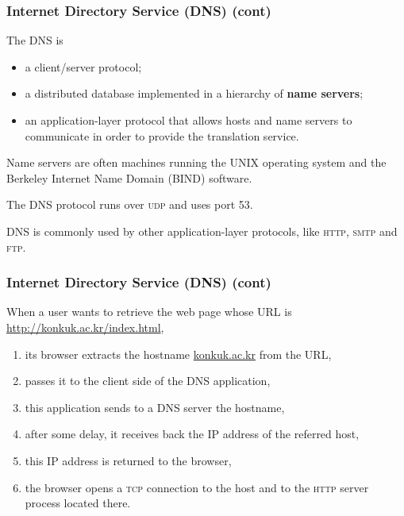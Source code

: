 %
\begin{frame}
\frametitle{Internet Directory Service (DNS) (cont)}

The DNS is
\begin{itemize}

  \item a client/server protocol;

  \item a distributed database implemented in a hierarchy of
  \textbf{name servers};

  \item an application-layer protocol that allows hosts and name
  servers to communicate in order to provide the translation service.

\end{itemize}

Name servers are often machines running the UNIX operating system and
the Berkeley Internet Name Domain (BIND) software.

The DNS protocol runs over \textsc{udp} and uses port 53.

DNS is commonly used by other application-layer protocols, like
\textsc{http}, \textsc{smtp} and \textsc{ftp}.

\end{frame}

%
\begin{frame}
\frametitle{Internet Directory Service (DNS) (cont)}

When a user wants to retrieve the web page whose URL is
\url{http://konkuk.ac.kr/index.html},
\begin{enumerate}

  \item its browser extracts the hostname \url{konkuk.ac.kr} from the URL,

  \item passes it to the client side of the DNS application,

  \item this application sends to a DNS server the hostname,

  \item after some delay, it receives back the IP address of the
    referred host,

  \item this IP address is returned to the browser,

  \item the browser opens a \textsc{tcp} connection to the host and to
    the \textsc{http} server process located there.

\end{enumerate}

\end{frame}

